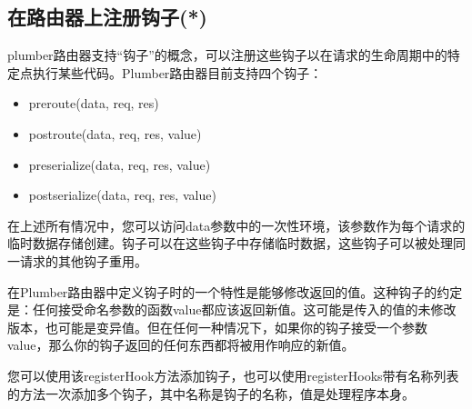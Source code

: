 \documentclass[]{book}
\newenvironment{Shaded}{\begin{snugshade}}{\end{snugshade}}
\newcommand{\KeywordTok}[1]{\textcolor[rgb]{0.13,0.29,0.53}{\textbf{#1}}}
\newcommand{\DataTypeTok}[1]{\textcolor[rgb]{0.13,0.29,0.53}{#1}}
\newcommand{\DecValTok}[1]{\textcolor[rgb]{0.00,0.00,0.81}{#1}}
\newcommand{\CharTok}[1]{\textcolor[rgb]{0.31,0.60,0.02}{#1}}
\newcommand{\StringTok}[1]{\textcolor[rgb]{0.31,0.60,0.02}{#1}}
\newcommand{\CommentTok}[1]{\textcolor[rgb]{0.56,0.35,0.01}{\textit{#1}}}
\newcommand{\ControlFlowTok}[1]{\textcolor[rgb]{0.13,0.29,0.53}{\textbf{#1}}}
\newcommand{\OperatorTok}[1]{\textcolor[rgb]{0.81,0.36,0.00}{\textbf{#1}}}
\newcommand{\NormalTok}[1]{#1}
\begin{document}
\subsection{在路由器上注册钩子(*)}

plumber路由器支持``钩子''的概念，可以注册这些钩子以在请求的生命周期中的特定点执行某些代码。Plumber路由器目前支持四个钩子：

\begin{itemize}
\item
  preroute(data, req, res)
\item
  postroute(data, req, res, value)
\item
  preserialize(data, req, res, value)
\item
  postserialize(data, req, res, value)
\end{itemize}

在上述所有情况中，您可以访问data参数中的一次性环境，该参数作为每个请求的临时数据存储创建。钩子可以在这些钩子中存储临时数据，这些钩子可以被处理同一请求的其他钩子重用。

在Plumber路由器中定义钩子时的一个特性是能够修改返回的值。这种钩子的约定是：任何接受命名参数的函数value都应该返回新值。这可能是传入的值的未修改版本，也可能是变异值。但在任何一种情况下，如果你的钩子接受一个参数value，那么你的钩子返回的任何东西都将被用作响应的新值。

您可以使用该registerHook方法添加钩子，也可以使用registerHooks带有名称列表的方法一次添加多个钩子，其中名称是钩子的名称，值是处理程序本身。

\begin{Shaded}
\end{Shaded}
\end{document}
